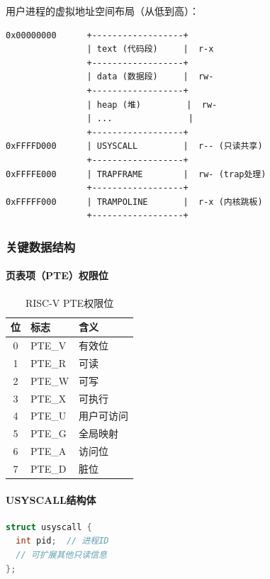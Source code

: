 用户进程的虚拟地址空间布局（从低到高）：

\begin{lstlisting}
0x00000000      +------------------+
                | text (代码段)     |  r-x
                +------------------+
                | data (数据段)     |  rw-
                +------------------+
                | heap (堆)         |  rw-
                | ...               |
                +------------------+
0xFFFFD000      | USYSCALL         |  r-- (只读共享)
                +------------------+
0xFFFFE000      | TRAPFRAME        |  rw- (trap处理)
                +------------------+
0xFFFFF000      | TRAMPOLINE       |  r-x (内核跳板)
                +------------------+
\end{lstlisting}

\subsubsection{关键数据结构}

\paragraph{页表项（PTE）权限位}

\begin{table}[H]
\centering
\begin{tabular}{|c|l|l|}
\hline
\textbf{位} & \textbf{标志} & \textbf{含义} \\
\hline
0 & PTE\_V & 有效位 \\
1 & PTE\_R & 可读 \\
2 & PTE\_W & 可写 \\
3 & PTE\_X & 可执行 \\
4 & PTE\_U & 用户可访问 \\
5 & PTE\_G & 全局映射 \\
6 & PTE\_A & 访问位 \\
7 & PTE\_D & 脏位 \\
\hline
\end{tabular}
\caption{RISC-V PTE权限位}
\end{table}

\paragraph{USYSCALL结构体}

\begin{lstlisting}[language=C]
struct usyscall {
  int pid;  // 进程ID
  // 可扩展其他只读信息
};
\end{lstlisting}

